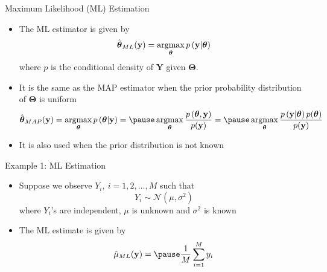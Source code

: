 \documentclass[t]{beamer}
\newcommand{\argmax}{\operatornamewithlimits{argmax}}
\begin{document}
\begin{frame}{Maximum Likelihood (ML) Estimation}
  \footnotesize
  \begin{itemize}
    \item \pause The ML estimator is given by
      \begin{equation*}
        \hat{\boldsymbol{\theta}}_{ML}(\mathbf{y}) = \argmax_{\boldsymbol{\theta}} p\left(\mathbf{y} | \boldsymbol{\theta}\right)
      \end{equation*}
      where $p$ is the conditional density of $\mathbf{Y}$ given $\boldsymbol{\Theta}$.
    \item \pause It is the same as the MAP estimator when the prior probability distribution of $\boldsymbol{\Theta}$ is uniform
      \begin{equation*}
        \hat{\boldsymbol{\theta}}_{MAP}(\mathbf{y}) = \argmax_{\boldsymbol{\theta}} p\left(\boldsymbol{\theta} | \mathbf{y}\right) = \pause \argmax_{\boldsymbol{\theta}} \frac{p\left(\boldsymbol{\theta}, \mathbf{y}\right)}{p(\mathbf{y})} = \pause \argmax_{\boldsymbol{\theta}} \frac{p\left(\mathbf{y}|\boldsymbol{\theta}\right)p(\boldsymbol{\theta})}{p(\mathbf{y})}
      \end{equation*}
    \item \pause It is also used when the prior distribution is not known
  \end{itemize}
  \normalsize
\end{frame}

\begin{frame}{Example 1: ML Estimation}
  \footnotesize
  \begin{itemize}
    \item \pause Suppose we observe $Y_i, \ i=1,2,\ldots,M$ such that 
      \begin{equation*}
        Y_i \sim \mathcal{N}(\mu, \sigma^2)
      \end{equation*}
      where $Y_i$'s are independent, $\mu$ is unknown and $\sigma^2$ is known
    \item \pause The ML estimate is given by
      \begin{equation*}
        \hat{\mu}_{ML}(\mathbf{y}) = \pause \frac{1}{M} \sum_{i=1}^M y_i
      \end{equation*}
  \end{itemize}
  \normalsize
\end{frame}
\end{document}
